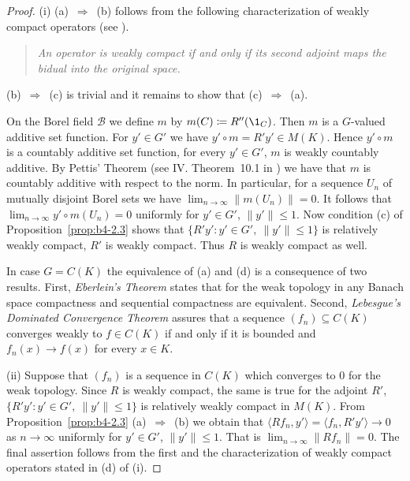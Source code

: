 \begin{proof}
(i) (a)~$\Rightarrow$~(b) follows from the following characterization of
weakly compact operators (see \eg \textcite[II. Proposition~9.4 ]{schaefer:1974}).
\begin{quote}
    \emph{
    An operator is weakly compact if and only if its second adjoint
    maps the bidual into the original space.
    }
\end{quote}
(b)~$\Rightarrow$~(c) is trivial and it remains to show that (c)~$\Rightarrow$~(a).

On the Borel field $\mathcal{B}$ we define $m$ by $m(C)  \coloneq  R''(\1_C)$.
Then $m$ is
a $G$-valued additive set function.
For $y' \in G'$ we have
$y'\circ m = R'y' \in M(K)$.
Hence $y'\circ m$ is a countably additive set function, for every $y' \in G'$,  \ie $m$ is weakly countably additive. 
By Pettis' Theorem (see IV. Theorem~10.1 in 
\textcite{dunfordschwartz:1958}) we have
that $m$ is countably additive with respect to the norm.
In particular, for a sequence $U_n$ of mutually disjoint Borel sets we have
$\lim_{n\to\infty}\|m(U_n)\| = 0$.
It follows that $\lim_{n\to\infty}y'\circ m(U_n) = 0$ uniformly for
$y' \in G'$, $\|y'\| \leq 1$.
Now condition (c) of Proposition~\ref{prop:b4-2.3} shows that $\{R'y'
\colon y' \in G',\ \|y'\| \leq 1\}$ is relatively weakly compact, \ie  $R'$ is
weakly compact.
Thus $R$ is weakly compact as well.

In case $G = C(K)$ the equivalence of\/ (a) and (d) is a consequence of
two results. First, \emph{Eberlein's Theorem} states that for the weak topology in any Banach space compactness and sequential compactness are
equivalent.
Second, \emph{Lebesgue's Dominated Convergence Theorem} assures
that a sequence $(f_n) \subseteq C(K)$ converges weakly to $f \in C(K)$ if and
only if it is bounded and $f_n(x) \to f(x)$ for every $x \in K$.
	
(ii) Suppose that $(f_n)$ is a sequence in $C(K)$ which converges to $0$ for
the weak topology.
Since $R$ is weakly compact, the same is true for
the adjoint $R'$, \ie $\{R'y' \colon y' \in G',\ \|y'\| \leq 1\}$ is relatively weakly compact in $M(K)$.
From Proposition~\ref{prop:b4-2.3} (a)~$\Rightarrow$~(b) we obtain that
$\langle Rf_n,y'\rangle = \langle f_n,R'y'\rangle \to 0$ as $n \to \infty$ uniformly for $y' \in G'$, $\|y'\|\leq1$.
That is $\lim_{n\to\infty}\|Rf_n\| = 0$.
The final assertion follows from the first and the characterization of
weakly compact operators stated in (d) of (i).
\end{proof}
